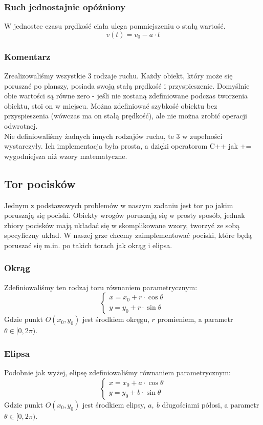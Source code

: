 	\subsubsection{Ruch jednostajnie opóźniony}
		\indent \indent W jednostce czasu prędkość ciała ulega pomniejszeniu o stałą wartość.
		$$ v(t)=v_0-a\cdot t $$
	\subsubsection{{\large Komentarz}}
		\indent \indent Zrealizowaliśmy wszystkie 3 rodzaje ruchu. Każdy obiekt, który może się poruszać po planszy, posiada swoją stałą prędkość i przyspieszenie. Domyślnie obie wartości są równe zero - jeśli nie zostaną zdefiniowane podczas tworzenia obiektu, stoi on w miejscu. Można zdefiniować szybkość obiektu bez przyspieszenia (wówczas ma on stałą prędkość), ale nie można zrobić operacji odwrotnej.\\
		Nie definiowaliśmy żadnych innych rodzajów ruchu, te 3 w zupełności wystarczyły. Ich implementacja była prosta, a dzięki operatorom C++ jak += wygodniejsza niż wzory matematyczne.

\newpage
	\subsection{Tor pocisków}
		\indent \indent Jednym z podstawowych problemów w naszym zadaniu jest tor po jakim poruszają się pociski. Obiekty wrogów  poruszają się w prosty sposób, jednak zbiory pocisków mają układać się w skomplikowane wzory, tworzyć ze sobą specyficzny układ. W naszej grze chcemy zaimplementować pociski, które będą poruszać się m.in. po takich torach jak okrąg i elipsa.
	\subsubsection{Okrąg}
		\indent \indent Zdefiniowaliśmy ten rodzaj toru równaniem parametrycznym:
		$$
		\begin{cases}
		x=x_0+r\cdot \cos{\theta}\\
		y=y_0+r\cdot \sin{\theta}
		\end{cases}
		$$
		Gdzie punkt $ O(x_0, y_0) $ jest środkiem okręgu, $ r $ promieniem, a parametr $ \theta \in [0, 2\pi ) $.
	\subsubsection{Elipsa}
		\indent \indent Podobnie jak wyżej, elipsę zdefiniowaliśmy równaniem parametrycznym:
		$$
		\begin{cases}
		x=x_0+a\cdot \cos{\theta}\\
		y=y_0+b\cdot \sin{\theta}
		\end{cases}
		$$
		Gdzie punkt $ O(x_0, y_0) $ jest środkiem elipsy, $ a,\:b $ długościami półosi, a parametr $ \theta \in [0, 2\pi ) $.

